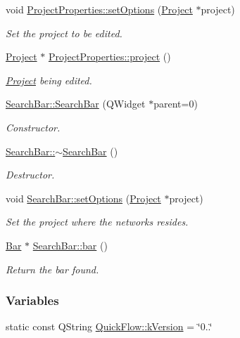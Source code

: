 \begin{DoxyCompactItemize}
void \hyperlink{group___window_gaa9b9347f570a52e17e4debb4f03be625}{Project\+Properties\+::set\+Options} (\hyperlink{class_project}{Project} $\ast$project)
\begin{DoxyCompactList}\small\item\em Set the project to be edited. \end{DoxyCompactList}\item 
\hyperlink{class_project}{Project} $\ast$ \hyperlink{group___window_ga241ef3f82071d6091e4addbda53a634c}{Project\+Properties\+::project} ()
\begin{DoxyCompactList}\small\item\em \hyperlink{class_project}{Project} being edited. \end{DoxyCompactList}\item 
\hyperlink{group___window_ga75f8caf009094148f56149b00996ac84}{Search\+Bar\+::\+Search\+Bar} (Q\+Widget $\ast$parent=0)
\begin{DoxyCompactList}\small\item\em Constructor. \end{DoxyCompactList}\item 
\hyperlink{group___window_ga553f2c7b9c15e7ae39cf988a6ef8f786}{Search\+Bar\+::$\sim$\+Search\+Bar} ()
\begin{DoxyCompactList}\small\item\em Destructor. \end{DoxyCompactList}\item 
void \hyperlink{group___window_ga840eb8fbdea559d31a7c2af6a4cbc480}{Search\+Bar\+::set\+Options} (\hyperlink{class_project}{Project} $\ast$project)
\begin{DoxyCompactList}\small\item\em Set the project where the networks resides. \end{DoxyCompactList}\item 
\hyperlink{class_bar}{Bar} $\ast$ \hyperlink{group___window_ga25ce5aca2c8db4e81e5357c9a4c01b56}{Search\+Bar\+::bar} ()
\begin{DoxyCompactList}\small\item\em Return the bar found. \end{DoxyCompactList}\end{DoxyCompactItemize}
\subsubsection*{Variables}
\begin{DoxyCompactItemize}
\item 
static const Q\+String \hyperlink{group___window_gabfc3b1280bdae9a9c046d56b1459ab99}{Quick\+Flow\+::k\+Version} = \char`\"{}0..\char`\"{}
\end{DoxyCompactItemize}


